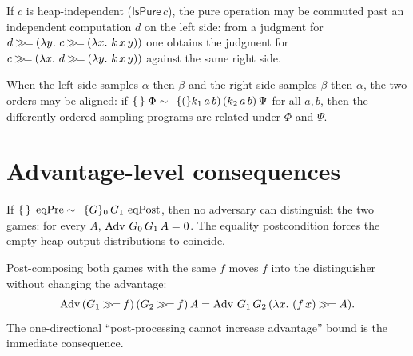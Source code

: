 \begin{theorem}
  \label{thm:rhoare-reorder-pure-l}
  \leanok
  If $c$ is heap-independent ($\mathsf{IsPure}\,c$), the pure operation may be
  commuted past an independent computation $d$ on the left side:
  from a judgment for $d \mathbin{\gg\!=} (\lambda y.\ c \mathbin{\gg\!=} (\lambda x.\ k\,x\,y))$ one
  obtains the judgment for $c \mathbin{\gg\!=} (\lambda x.\ d \mathbin{\gg\!=} (\lambda y.\ k\,x\,y))$
  against the same right side.
\end{theorem}

\begin{theorem}
  \label{thm:rhoare-sample-comm}
  \leanok
  When the left side samples $\alpha$ then $\beta$ and the right side samples
  $\beta$ then $\alpha$, the two orders may be aligned: if
  $\{\,\}\;\Phi \sim \,\;\{(\}k_1\,a\,b)\,(k_2\,a\,b)\,\Psi$ for all $a,b$, then the
  differently-ordered sampling programs are related under $\Phi$ and $\Psi$.
\end{theorem}

\section{Advantage-level consequences}

\begin{theorem}
  \label{thm:advantage-zero-of-rhoare}
  \leanok
  If $\{\,\}\;\operatorname{eqPre} \sim \,\;\{G\}_0\,G_1\,\operatorname{eqPost}$, then no adversary can distinguish the
  two games: for every $A$, $\operatorname{Adv}\,G_0\,G_1\,A = 0$. The equality
  postcondition forces the empty-heap output distributions to coincide.
\end{theorem}

\begin{theorem}
  \label{thm:advantage-factorization}
  \leanok
  Post-composing both games with the same $f$ moves $f$ into the distinguisher
  without changing the advantage:
  \[
    \operatorname{Adv}\,(G_1 \mathbin{\gg\!=} f)\,(G_2 \mathbin{\gg\!=} f)\,A
      = \operatorname{Adv}\,G_1\,G_2\,(\lambda x.\ (f\,x) \mathbin{\gg\!=} A).
  \]
  The one-directional ``post-processing cannot increase advantage'' bound is the
  immediate consequence.
\end{theorem}

